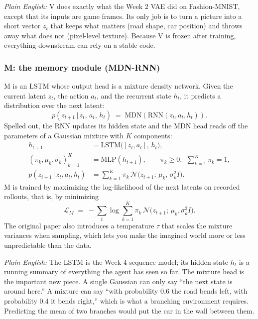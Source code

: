 \documentclass[11pt]{article}
\newcommand{\given}{\,\vert\,}
\theoremstyle{remark}
\newcommand{\plain}[1]{\medskip\noindent\textit{Plain English:} #1\medskip}
\begin{document}
\plain{V does exactly what the Week 2 VAE did on Fashion-MNIST, except that its inputs are game frames. Its only job is to turn a picture into a short vector $z_t$ that keeps what matters (road shape, car position) and throws away what does not (pixel-level texture). Because V is frozen after training, everything downstream can rely on a stable code.}

\subsubsection*{M: the memory module (MDN-RNN)}

M is an LSTM whose output head is a mixture density network. Given the current latent $z_t$, the action $a_t$, and the recurrent state $h_t$, it predicts a distribution over the next latent:
\begin{equation}
  p\!\left(z_{t+1} \given z_t,\, a_t,\, h_t\right) \;=\; \mathrm{MDN}\!\left(\mathrm{RNN}(z_t, a_t, h_t)\right).
  \label{eq:mdnrnn}
\end{equation}
Spelled out, the RNN updates its hidden state and the MDN head reads off the parameters of a Gaussian mixture with $K$ components:
\begin{align}
  h_{t+1} &= \mathrm{LSTM}\big([z_t, a_t],\, h_t\big), \label{eq:rnn}\\
  (\pi_{k}, \mu_{k}, \sigma_{k})_{k=1}^{K} &= \mathrm{MLP}(h_{t+1}), \qquad \pi_k \ge 0,\ \ \sum_{k=1}^K \pi_k = 1, \label{eq:mdnhead}\\
  p(z_{t+1}\given z_t, a_t, h_t) &= \sum_{k=1}^{K} \pi_k\, \mathcal N\!\big(z_{t+1};\, \mu_k,\, \sigma_k^2 I\big). \label{eq:mixture}
\end{align}
M is trained by maximizing the log-likelihood of the next latents on recorded rollouts, that is, by minimizing
\begin{equation}
  \mathcal L_M \;=\; -\sum_{t} \log \sum_{k=1}^{K} \pi_k\, \mathcal N\!\big(z_{t+1};\, \mu_k, \sigma_k^2 I\big).
  \label{eq:mdnloss}
\end{equation}
The original paper also introduces a temperature $\tau$ that scales the mixture variances when sampling, which lets you make the imagined world more or less unpredictable than the data.

\plain{The LSTM is the Week 4 sequence model; its hidden state $h_t$ is a running summary of everything the agent has seen so far. The mixture head is the important new piece. A single Gaussian can only say ``the next state is around here.'' A mixture can say ``with probability 0.6 the road bends left, with probability 0.4 it bends right,'' which is what a branching environment requires. Predicting the mean of two branches would put the car in the wall between them.}
\end{document}
